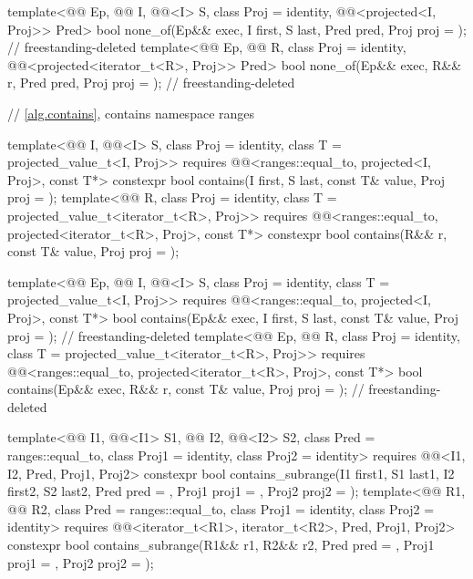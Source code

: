 \begin{codeblock}
{{    template<@@ Ep, @@ I, @@<I> S,
             class Proj = identity, @@<projected<I, Proj>> Pred>
      bool none_of(Ep&& exec, I first, S last, Pred pred, Proj proj = {});  // freestanding-deleted
    template<@@ Ep, @@ R, class Proj = identity,
             @@<projected<iterator_t<R>, Proj>> Pred>
      bool none_of(Ep&& exec, R&& r, Pred pred, Proj proj = {});            // freestanding-deleted
  }

  // \ref{alg.contains}, contains
  namespace ranges {
    template<@@ I, @@<I> S, class Proj = identity,
             class T = projected_value_t<I, Proj>>
      requires @@<ranges::equal_to, projected<I, Proj>, const T*>
      constexpr bool contains(I first, S last, const T& value, Proj proj = {});
    template<@@ R, class Proj = identity,
             class T = projected_value_t<iterator_t<R>, Proj>>
      requires
        @@<ranges::equal_to, projected<iterator_t<R>, Proj>, const T*>
      constexpr bool contains(R&& r, const T& value, Proj proj = {});

    template<@@ Ep, @@ I, @@<I> S,
             class Proj = identity, class T = projected_value_t<I, Proj>>
      requires @@<ranges::equal_to, projected<I, Proj>, const T*>
      bool contains(Ep&& exec, I first, S last, const T& value,
                    Proj proj = {});                                        // freestanding-deleted
    template<@@ Ep, @@ R, class Proj = identity,
             class T = projected_value_t<iterator_t<R>, Proj>>
      requires
        @@<ranges::equal_to, projected<iterator_t<R>, Proj>, const T*>
      bool contains(Ep&& exec, R&& r, const T& value, Proj proj = {});      // freestanding-deleted

    template<@@ I1, @@<I1> S1,
             @@ I2, @@<I2> S2,
             class Pred = ranges::equal_to, class Proj1 = identity, class Proj2 = identity>
      requires @@<I1, I2, Pred, Proj1, Proj2>
      constexpr bool contains_subrange(I1 first1, S1 last1, I2 first2, S2 last2,
                                       Pred pred = {}, Proj1 proj1 = {}, Proj2 proj2 = {});
    template<@@ R1, @@ R2,
             class Pred = ranges::equal_to, class Proj1 = identity, class Proj2 = identity>
      requires @@<iterator_t<R1>, iterator_t<R2>, Pred, Proj1, Proj2>
      constexpr bool contains_subrange(R1&& r1, R2&& r2,
                                       Pred pred = {}, Proj1 proj1 = {}, Proj2 proj2 = {});

}}
\end{codeblock}
